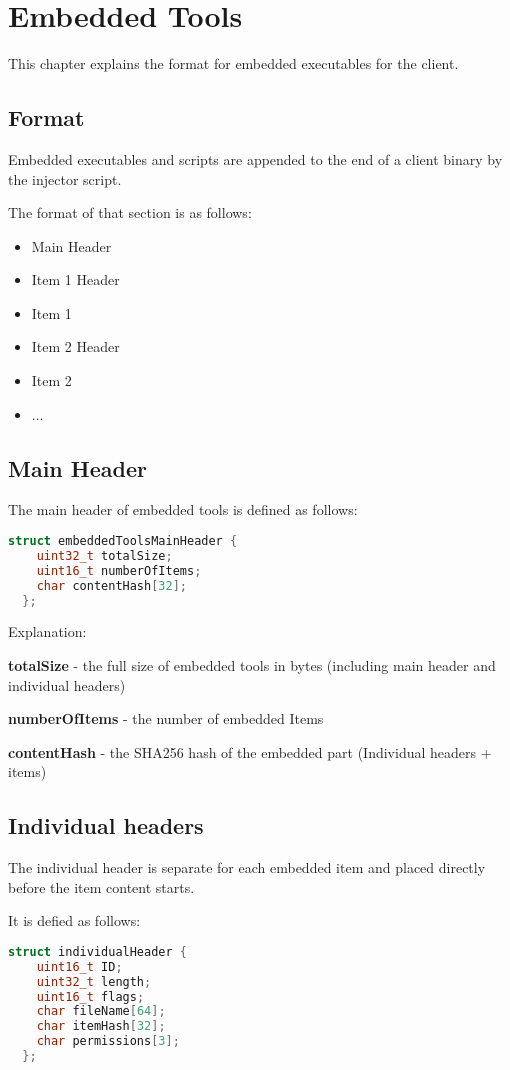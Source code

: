 \chapter{Embedded Tools}
This chapter explains the format for embedded executables for the client.

\section{Format}
Embedded executables and scripts are appended to the end of a client binary by the injector script.

The format of that section is as follows:
\begin{itemize}
  \item Main Header
  \item Item 1 Header
  \item Item 1
  \item Item 2 Header
  \item Item 2
  \item ...
\end{itemize}
\section{Main Header}
The main header of embedded tools is defined as follows:
\begin{lstlisting}[language=C++]
  struct embeddedToolsMainHeader {
    uint32_t totalSize;
    uint16_t numberOfItems;
    char contentHash[32];
  };
\end{lstlisting}

Explanation:

\textbf{totalSize} - the full size of embedded tools in bytes (including main header and individual headers)

\textbf{numberOfItems} - the number of embedded Items

\textbf{contentHash} - the SHA256 hash of the embedded part (Individual headers + items)

\section{Individual headers}

The individual header is separate for each embedded item and placed directly before the item content starts.

It is defied as follows:
\begin{lstlisting}[language=C++]
  struct individualHeader {
    uint16_t ID;
    uint32_t length;
    uint16_t flags;
    char fileName[64];
    char itemHash[32];
    char permissions[3];
  };
\end{lstlisting}


